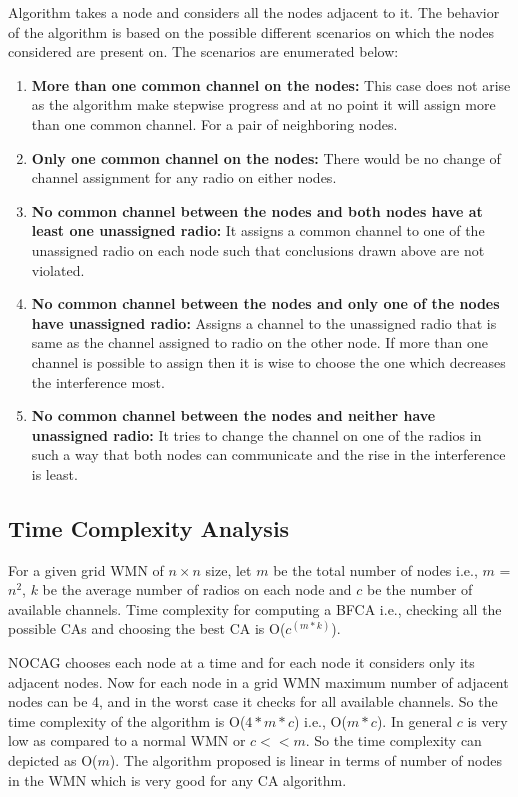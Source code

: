 \documentclass[conference]{IEEEtran}
\begin{document}
Algorithm takes a node and considers all the nodes adjacent to it. 
The behavior of the algorithm is based on the possible different scenarios on which the nodes considered are present on. 
The scenarios are enumerated below:

\begin{enumerate}
 \item \textbf{More than one common channel on the nodes:}
        This case does not arise as the algorithm make stepwise progress and at no point it will assign more than one common channel.
        For a pair of neighboring nodes.
  \item \textbf{Only one common channel on the nodes:}        
        There would be no change of channel assignment for any radio on either nodes.
   \item  \textbf{No common channel between the nodes and both nodes have at least one unassigned radio:}
        It assigns a common channel to one of the unassigned radio on each node such that conclusions drawn above are not violated.

   \item \textbf{No common channel between the nodes and only one of the nodes have unassigned radio:}
        Assigns a channel to the unassigned radio that is same as the channel assigned to radio on the other node. 
        If more than one channel is possible to assign then it is wise to choose the one which decreases the interference most.

   \item \textbf{No common channel between the nodes and neither have unassigned radio:}
         It tries to change the channel on one of the radios in such a way that both nodes can communicate and the rise in the interference is least.


   
\end{enumerate}
\subsection{Time Complexity Analysis} 
For a given grid WMN of $n \times n$ size, let $m$ be the total number of nodes i.e., $m$ = $n^{2}$, $k$ be the average number of radios on each node and
$c$ be the number of available channels.
Time complexity for computing a BFCA i.e., checking all the possible CAs and choosing the best CA is O($c^{(m*k)}$).


NOCAG chooses each node at a time and for each node it considers only its adjacent nodes.
Now for each node in a grid WMN maximum number of adjacent nodes can be 4, and in the worst case it checks for all available channels.
So the time complexity of the algorithm is O($4*m*c$) i.e., O($m*c$).
In general  $c$ is very low as compared to a normal WMN or $c < < m$. So the time complexity can depicted as O($m$).
The algorithm proposed is linear in terms of number of nodes in the WMN which is very good for any CA algorithm.
\end{document}
